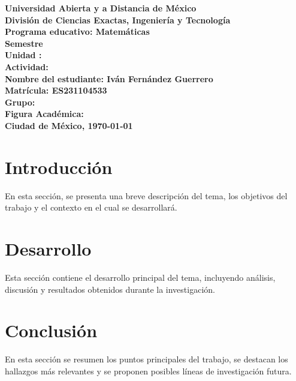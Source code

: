 \documentclass{article}
\begin{document}
{
\begin{titlepage}
\centering
\vspace*{5cm} %

{\Huge\bfseries\textbf{Universidad Abierta y a Distancia de México}}\\[1cm]
{\Large\bfseries\textbf{División de Ciencias Exactas, Ingeniería y Tecnología}}\\[1cm]
{\Large\bfseries\textbf{Programa educativo: Matemáticas}}\\[0.5cm]
{\Large\bfseries\textbf{Semestre }}\\[0.5cm]
{\Large\bfseries\textbf{Unidad : }}\\[0.5cm]
{\Large\bfseries\textbf{Actividad: }}\\[2cm]
{\Large\bfseries\textbf{Nombre del estudiante: Iván Fernández Guerrero}}\\[0.5cm]
{\Large\bfseries\textbf{Matrícula: ES231104533}}\\[0.5cm]
{\Large\bfseries\textbf{Grupo: }}\\[0.5cm]
{\Large\bfseries\textbf{Figura Académica: }}\\[2cm]
{\Large\bfseries\textbf{Ciudad de México, \today}}\\[2cm]

\vfill
\end{titlepage}
\restoregeometry %
} %

\section{Introducción}
En esta sección, se presenta una breve descripción del tema, los objetivos del trabajo y el contexto en el cual se desarrollará.

\newpage
\section{Desarrollo}
Esta sección contiene el desarrollo principal del tema, incluyendo análisis, discusión y resultados obtenidos durante la investigación.


\newpage
\section{Conclusión}
En esta sección se resumen los puntos principales del trabajo, se destacan los hallazgos más relevantes y se proponen posibles líneas de investigación futura.
\end{document}
